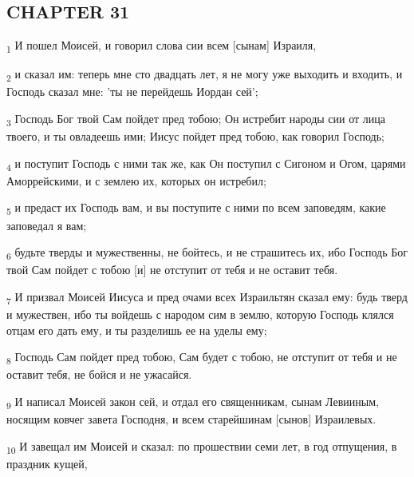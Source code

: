 \subsection{CHAPTER 31}
\begin{tcolorbox}
\textsubscript{1} И пошел Моисей, и говорил слова сии всем [сынам] Израиля,
\end{tcolorbox}
\begin{tcolorbox}
\textsubscript{2} и сказал им: теперь мне сто двадцать лет, я не могу уже выходить и входить, и Господь сказал мне: 'ты не перейдешь Иордан сей';
\end{tcolorbox}
\begin{tcolorbox}
\textsubscript{3} Господь Бог твой Сам пойдет пред тобою; Он истребит народы сии от лица твоего, и ты овладеешь ими; Иисус пойдет пред тобою, как говорил Господь;
\end{tcolorbox}
\begin{tcolorbox}
\textsubscript{4} и поступит Господь с ними так же, как Он поступил с Сигоном и Огом, царями Аморрейскими, и с землею их, которых он истребил;
\end{tcolorbox}
\begin{tcolorbox}
\textsubscript{5} и предаст их Господь вам, и вы поступите с ними по всем заповедям, какие заповедал я вам;
\end{tcolorbox}
\begin{tcolorbox}
\textsubscript{6} будьте тверды и мужественны, не бойтесь, и не страшитесь их, ибо Господь Бог твой Сам пойдет с тобою [и] не отступит от тебя и не оставит тебя.
\end{tcolorbox}
\begin{tcolorbox}
\textsubscript{7} И призвал Моисей Иисуса и пред очами всех Израильтян сказал ему: будь тверд и мужествен, ибо ты войдешь с народом сим в землю, которую Господь клялся отцам его дать ему, и ты разделишь ее на уделы ему;
\end{tcolorbox}
\begin{tcolorbox}
\textsubscript{8} Господь Сам пойдет пред тобою, Сам будет с тобою, не отступит от тебя и не оставит тебя, не бойся и не ужасайся.
\end{tcolorbox}
\begin{tcolorbox}
\textsubscript{9} И написал Моисей закон сей, и отдал его священникам, сынам Левииным, носящим ковчег завета Господня, и всем старейшинам [сынов] Израилевых.
\end{tcolorbox}
\begin{tcolorbox}
\textsubscript{10} И завещал им Моисей и сказал: по прошествии семи лет, в год отпущения, в праздник кущей,
\end{tcolorbox}

